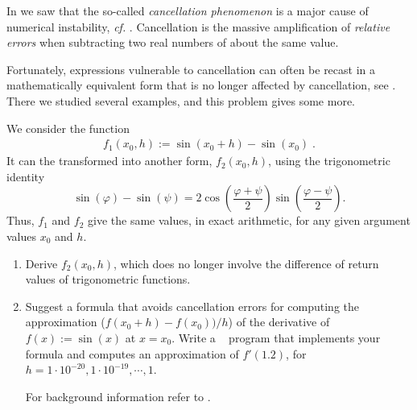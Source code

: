 
\renewcommand{\chpt}{ch_matvec}

\begin{problem} \label{prb:cancellation}
  In  we saw that the so-called \emph{cancellation phenomenon} is
  a major cause of numerical instability, \emph{cf.} . Cancellation
  is the massive amplification of \emph{relative errors} when subtracting two
  real numbers of about the same value. 

  Fortunately, expressions vulnerable to cancellation can often be recast in
  a mathematically equivalent form that is no longer affected by cancellation,
  see . There we studied several examples, and this problem
  gives some more.

 
 \begin{subproblem}[1]
   We consider the function
   \begin{gather}
     \label{eq:cancel:1}
     f_1(x_0,h) := \sin(x_0 + h) - \sin(x_0)\;.
   \end{gather}
   It  can the transformed into another form, $f_2(x_0,h)$, using the trigonometric identity
   \[
   \sin(\varphi) - \sin(\psi) = 2 \cos \left(\frac{\varphi + \psi}{2} \right) \sin \left(\frac{\varphi - \psi}{2} \right).
   \]
   Thus, $f_1$ and $f_2$ give the same values, in exact arithmetic, for any given argument values $x_0$ and $h$.
  
  \begin{enumerate}
   \item Derive $f_2(x_0,h)$, which does no longer involve the difference of
     return values of trigonometric functions.
   \item Suggest a formula that avoids cancellation errors for computing the
     approximation ($f(x_0 + h) - f(x_0)) / h$) of the derivative of
     $f(x) := \sin(x)$ at $x = x_0$. Write a \Matlab~ program that implements your
     formula and computes an approximation of $f'(1.2)$, for
     $h = 1 \cdot 10^{-20}, 1 \cdot 10^{-19},\cdots,1$.
     
     \begin{hint}
       For background information refer to .
     \end{hint}


\end{enumerate}
\end{subproblem}
\end{problem}
